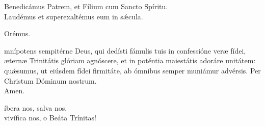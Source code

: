 \va Benedicámus Patrem, et Fílium cum Sancto Spíritu.\\
\ra Laudémus et superexaltémus eum in s\'\ae cula.
\medskip

{\large Orémus.}

 mnípotens sempitérne Deus, qui dedísti fámulis tuis in confessióne
ver\ae{} fídei, \ae tern\ae{} Trinitátis glóriam agnóscere, et in
poténtia maiestátis adoráre unitátem: qu\'\ae sumus, ut eiúsdem
fídei firmitáte, ab ómnibus semper muniámur advérsis. Per Christum
Dóminum nostrum.\\
\ra Amen.\\


 íbera nos, salva nos,\\
vivífica nos, o Beáta Trínitas!